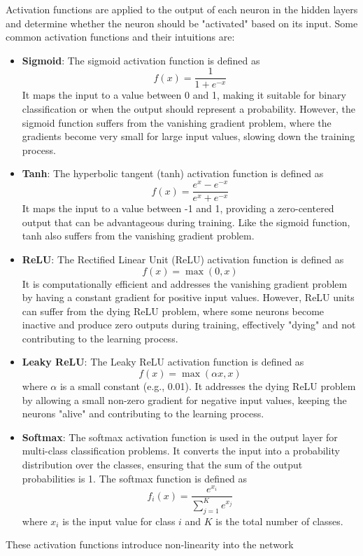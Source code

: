\documentclass[12pt]{article}
\begin{document}
Activation functions are applied to the output of each neuron in the hidden layers and determine whether the neuron should be "activated" based on its input. Some common activation functions and their intuitions are:

\begin{itemize}
\item \textbf{Sigmoid}: The sigmoid activation function is defined as $$f(x) = \frac{1}{1 + e^{-x}}$$ It maps the input to a value between 0 and 1, making it suitable for binary classification or when the output should represent a probability. However, the sigmoid function suffers from the vanishing gradient problem, where the gradients become very small for large input values, slowing down the training process.

\item \textbf{Tanh}: The hyperbolic tangent (tanh) activation function is defined as $$f(x) = \frac{e^x - e^{-x}}{e^x + e^{-x}}$$ It maps the input to a value between -1 and 1, providing a zero-centered output that can be advantageous during training. Like the sigmoid function, tanh also suffers from the vanishing gradient problem.

\item \textbf{ReLU}: The Rectified Linear Unit (ReLU) activation function is defined as $$f(x) = \max(0, x)$$It is computationally efficient and addresses the vanishing gradient problem by having a constant gradient for positive input values. However, ReLU units can suffer from the dying ReLU problem, where some neurons become inactive and produce zero outputs during training, effectively "dying" and not contributing to the learning process.

\item \textbf{Leaky ReLU}: The Leaky ReLU activation function is defined as $$f(x) = \max(\alpha x, x)$$ where $\alpha$ is a small constant (e.g., 0.01). It addresses the dying ReLU problem by allowing a small non-zero gradient for negative input values, keeping the neurons "alive" and contributing to the learning process.

\item {\textbf{Softmax}: The softmax activation function is used in the output layer for multi-class classification problems. It converts the input into a probability distribution over the classes, ensuring that the sum of the output probabilities is 1. The softmax function is defined as
$$f_i(x) = \frac{e^{x_i}}{\sum_{j=1}^K e^{x_j}}$$
where $x_i$ is the input value for class $i$ and $K$ is the total number of classes.}
\end{itemize}
These activation functions introduce non-linearity into the network
\end{document}
